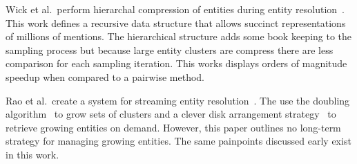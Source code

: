 
Wick et al.\ perform hierarchal compression of entities during
entity resolution~\cite{wick2013discriminative}.
This work defines a recursive data structure that allows succinct representations
of millions of mentions. 
The hierarchical structure adds some book keeping to the sampling process but because
large entity clusters are compress there are less comparison for each sampling iteration. 
This works displays orders of magnitude speedup
when compared to a pairwise method.

Rao et al.\ create a system for streaming entity resolution~\cite{rao2010streaming}.
The use the doubling algorithm~\cite{charikar1997incremental} to grow sets of clusters
and a clever disk arrangement strategy~\cite{omiecinski1984global} to retrieve
growing entities on demand.
However, this paper outlines no long-term strategy for managing growing entities.
The same painpoints discussed early exist in this work.



